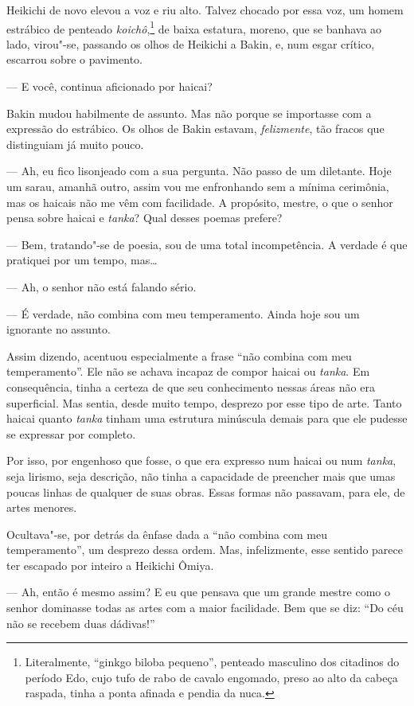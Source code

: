 Heikichi de novo elevou a voz e riu alto. Talvez chocado por essa voz,
um homem estrábico de penteado \textit{koichô},\footnote{ Literalmente, 
``ginkgo biloba pequeno'', penteado masculino dos citadinos 
do período Edo, cujo tufo de rabo de cavalo engomado, preso ao alto da cabeça raspada, 
tinha a ponta afinada e pendia da nuca.} de baixa estatura,
moreno, que se banhava ao lado, virou"-se, passando os olhos de Heikichi
a Bakin, e, num esgar crítico, escarrou sobre o pavimento.

--- E você, continua aficionado por haicai?

Bakin mudou habilmente de assunto. Mas não porque se importasse com a
expressão do estrábico. Os olhos de Bakin estavam,
\textit{felizmente}, tão fracos que distinguiam já muito pouco.

--- Ah, eu fico lisonjeado com a sua pergunta. Não passo de um diletante.
Hoje um sarau, amanhã outro, assim vou me enfronhando sem a mínima
cerimônia, mas os haicais não me vêm com facilidade. 
A propósito, mestre, o que o senhor pensa
sobre haicai e \textit{tanka}? Qual desses poemas prefere?

--- Bem, tratando"-se de poesia, sou de uma total incompetência. A verdade
é que pratiquei por um tempo, mas\ldots{}

--- Ah, o senhor não está falando sério.

--- É verdade, não combina com meu temperamento. Ainda hoje sou um
ignorante no assunto.

Assim dizendo, acentuou especialmente a frase ``não combina com meu
temperamento''. Ele não se achava incapaz de compor haicai ou
\textit{tanka}. Em consequência, tinha a certeza de que seu
conhecimento nessas áreas não era superficial. Mas sentia, desde muito
tempo, desprezo por esse tipo de arte. Tanto haicai quanto
\textit{tanka} tinham uma estrutura minúscula demais para que ele
pudesse se expressar por completo.

Por isso, por engenhoso que fosse, o que era expresso num haicai ou num
\textit{tanka}, seja lirismo, seja descrição, não tinha a capacidade de
preencher mais que umas poucas linhas de qualquer de suas obras. Essas
formas não passavam, para ele, de artes menores.

\sectionitem
Ocultava"-se, por detrás da ênfase dada a ``não combina com meu
temperamento'', um desprezo dessa ordem. Mas, infelizmente, esse sentido
parece ter escapado por inteiro a Heikichi Ômiya.

--- Ah, então é mesmo assim? E eu que pensava que um grande mestre como o 
senhor dominasse todas as artes com a maior facilidade. Bem que se diz:
``Do céu não se recebem duas dádivas!''

